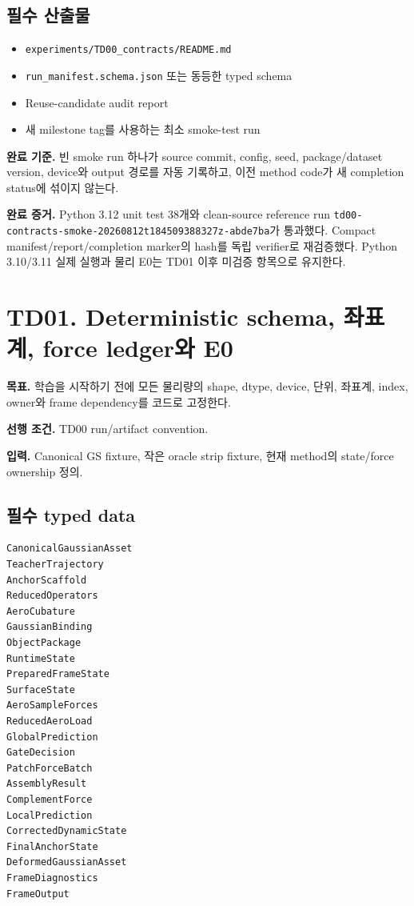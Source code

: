 \documentclass[10pt,a4paper]{article}
\newcommand{\code}[1]{\texttt{#1}}
\newcommand{\artifact}[1]{\textcolor{ProgressBlue}{\nolinkurl{#1}}}
\begin{document}
\subsection*{필수 산출물}

\begin{itemize}
  \item \artifact{experiments/TD00_contracts/README.md}
  \item \artifact{run_manifest.schema.json} 또는 동등한 typed schema
  \item Reuse-candidate audit report
  \item 새 milestone tag를 사용하는 최소 smoke-test run
\end{itemize}

\textbf{완료 기준.}
빈 smoke run 하나가 source commit, config, seed, package/dataset version, device와 output 경로를 자동 기록하고,
이전 method code가 새 completion status에 섞이지 않는다.

\textbf{완료 증거.}
Python 3.12 unit test 38개와 clean-source reference run
\code{td00-contracts-smoke-20260812t184509388327z-abde7ba}가 통과했다.
Compact manifest/report/completion marker의 hash를 독립 verifier로 재검증했다.
Python 3.10/3.11 실제 실행과 물리 E0는 TD01 이후 미검증 항목으로 유지한다.

\section{TD01. Deterministic schema, 좌표계, force ledger와 E0}

\textbf{목표.}
학습을 시작하기 전에 모든 물리량의 shape, dtype, device, 단위, 좌표계, index, owner와 frame dependency를 코드로 고정한다.

\textbf{선행 조건.} TD00 run/artifact convention.

\textbf{입력.}
Canonical GS fixture, 작은 oracle strip fixture, 현재 method의 state/force ownership 정의.

\subsection*{필수 typed data}

\begin{lstlisting}
CanonicalGaussianAsset
TeacherTrajectory
AnchorScaffold
ReducedOperators
AeroCubature
GaussianBinding
ObjectPackage
RuntimeState
PreparedFrameState
SurfaceState
AeroSampleForces
ReducedAeroLoad
GlobalPrediction
GateDecision
PatchForceBatch
AssemblyResult
ComplementForce
LocalPrediction
CorrectedDynamicState
FinalAnchorState
DeformedGaussianAsset
FrameDiagnostics
FrameOutput
\end{lstlisting}
\end{document}
